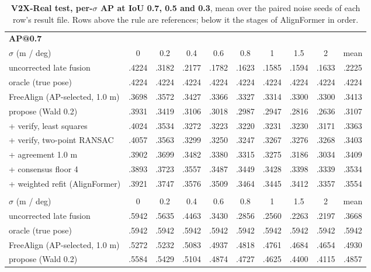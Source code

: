 \begin{table}[t]
  \centering\small
  \caption{\textbf{V2X-Real test, per-$\sigma$ AP at IoU 0.7, 0.5 and 0.3}, mean over the paired noise seeds of each row's result file. Rows above the rule are references; below it the stages of AlignFormer in order.}
  \label{tab:supp_sigma_v2xreal}
  \begin{tabular}{lccccccccc}
    \toprule
    \multicolumn{10}{l}{\textbf{AP@0.7}} \\
    $\sigma$ (m / deg) & 0 & 0.2 & 0.4 & 0.6 & 0.8 & 1 & 1.5 & 2 & mean \\
    \midrule
    uncorrected late fusion & .4224 & .3182 & .2177 & .1782 & .1623 & .1585 & .1594 & .1633 & .2225 \\
    oracle (true pose) & .4224 & .4224 & .4224 & .4224 & .4224 & .4224 & .4224 & .4224 & .4224 \\
    FreeAlign (AP-selected, 1.0 m) & .3698 & .3572 & .3427 & .3366 & .3327 & .3314 & .3300 & .3300 & .3413 \\
    \midrule
    propose (Wald 0.2) & .3931 & .3419 & .3106 & .3018 & .2987 & .2947 & .2816 & .2636 & .3107 \\
    + verify, least squares & .4024 & .3534 & .3272 & .3223 & .3220 & .3231 & .3230 & .3171 & .3363 \\
    + verify, two-point RANSAC & .4057 & .3563 & .3299 & .3250 & .3247 & .3267 & .3276 & .3268 & .3403 \\
    + agreement 1.0 m & .3902 & .3699 & .3482 & .3380 & .3315 & .3275 & .3186 & .3034 & .3409 \\
    + consensus floor 4 & .3893 & .3723 & .3557 & .3487 & .3449 & .3428 & .3398 & .3339 & .3534 \\
    + weighted refit (AlignFormer) & .3921 & .3747 & .3576 & .3509 & .3464 & .3445 & .3412 & .3357 & .3554 \\
    \addlinespace
    \multicolumn{10}{l}{\textbf{AP@0.5}} \\
    $\sigma$ (m / deg) & 0 & 0.2 & 0.4 & 0.6 & 0.8 & 1 & 1.5 & 2 & mean \\
    \midrule
    uncorrected late fusion & .5942 & .5635 & .4463 & .3430 & .2856 & .2560 & .2263 & .2197 & .3668 \\
    oracle (true pose) & .5942 & .5942 & .5942 & .5942 & .5942 & .5942 & .5942 & .5942 & .5942 \\
    FreeAlign (AP-selected, 1.0 m) & .5272 & .5232 & .5083 & .4937 & .4818 & .4761 & .4684 & .4654 & .4930 \\
    \midrule
    propose (Wald 0.2) & .5584 & .5429 & .5104 & .4874 & .4727 & .4625 & .4400 & .4115 & .4857 \\

\end{tabular}
\end{table}
